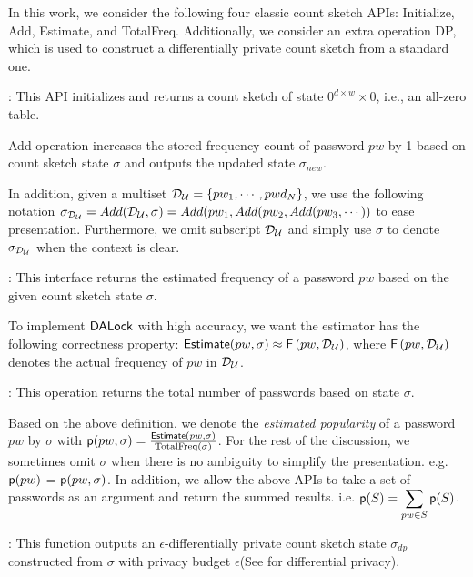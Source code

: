 In this work, we consider the following four classic count sketch APIs: Initialize, Add, Estimate, and TotalFreq. Additionally, we consider an extra operation DP, which is used to construct a differentially private count sketch from a standard one.


: This API initializes and returns a count sketch of state $0^{d\times w}\times 0$, i.e., an all-zero table.


 Add operation increases the stored frequency count of password $pw$ by 1 based on count sketch state $\sigma$ and outputs the updated state $\sigma_{new}$.


In addition, given a multiset $\mathcal{D}_{{\mathcal{U}}} = \{pw_1,\cdots,pwd_N\}$, we use the following notation $\sigma_{\mathcal{D}_{{\mathcal{U}}}} =  Add(\mathcal{D}_{{\mathcal{U}}},\sigma) \\= Add(pw_1, Add(pw_2,Add(pw_3,\cdots))$ to ease presentation. Furthermore, we omit subscript $\mathcal{D}_{{\mathcal{U}}}$ and simply use $\sigma$ to denote $\sigma_{\mathcal{D}_{{\mathcal{U}}}}$ when the context is clear.


: This interface returns the estimated frequency of a password $pw$ based on the given count sketch state $\sigma$.


To implement $\mathsf{DALock}$ with high accuracy, we want the estimator has the following correctness property: $\textsf{Estimate}(pw,\sigma) \approx \mathsf{F}\left(pw, \mathcal{D}_{{\mathcal{U}}} \right)$, where $\mathsf{F}\left(pw, \mathcal{D}_{{\mathcal{U}}}\right)$ denotes the actual frequency of $pw$ in $\mathcal{D}_{{\mathcal{U}}}$.

: This operation returns the total number of passwords based on state $\sigma$.


Based on the above definition, we denote the \emph{estimated popularity} of a password $pw$ by $\sigma$ with $\textsf{p}(pw,\sigma) = \frac{\textsf{Estimate}(pw,\sigma)}{\text{TotalFreq}(\sigma)}$. For the rest of the discussion, we sometimes omit $\sigma$ when there is no ambiguity to simplify the presentation. e.g. $\textsf{p}(pw)$ = $\textsf{p}(pw,\sigma)$. In addition, we allow the above APIs to take a set of passwords as an argument and return the summed results. i.e. $\textsf{p}(S) = \displaystyle{\sum_{pw \in S} \textsf{p}(S)}$. 


: This function outputs an $\epsilon$-differentially private count sketch state $\sigma_{dp}$ constructed from $\sigma$ with privacy budget $\epsilon$(See  for differential privacy).



